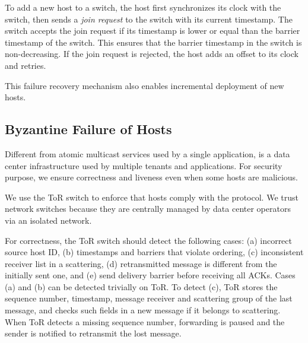 {%

To add a new host to a switch, the host first synchronizes its clock with the switch, then sends a \emph{join request} to the switch with its current timestamp.
The switch accepts the join request if its timestamp is lower or equal than the barrier timestamp of the switch.
This ensures that the barrier timestamp in the switch is non-decreasing.
If the join request is rejected, the host adds an offset to its clock and retries.

This failure recovery mechanism also enables incremental deployment of new hosts.


\subsection{Byzantine Failure of Hosts}
\label{sec:byzantine}

Different from atomic multicast services used by a single application, \sys is a data center infrastructure used by multiple tenants and applications.
For security purpose, we ensure correctness and liveness even when some hosts are malicious.

We use the ToR switch to enforce that hosts comply with the \sys protocol.
We trust network switches because they are centrally managed by data center operators via an isolated network.

For correctness, the ToR switch should detect the following cases: (a) incorrect source host ID, (b) timestamps and barriers that violate ordering, (c) inconsistent receiver list in a scattering, (d) retransmitted message is different from the initially sent one, and (e) send delivery barrier before receiving all ACKs.
Cases (a) and (b) can be detected trivially on ToR.
To detect (c), ToR stores the sequence number, timestamp, message receiver and scattering group of the last message, and checks such fields in a new message if it belongs to  scattering.
When ToR detects a missing sequence number, forwarding is paused and the sender is notified to retransmit the lost message.

}
